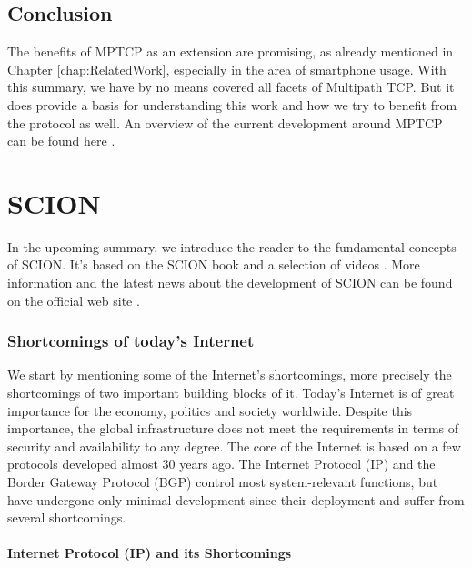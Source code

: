 \subsection*{Conclusion}

The benefits of MPTCP as an extension are promising, as already mentioned in Chapter \ref{chap:RelatedWork}, especially in the area of smartphone usage.  With this summary, we have by no means covered all facets of Multipath TCP. But it does provide a basis for understanding this work and how we try to benefit from the protocol as well. An overview of the current development around MPTCP can be found here \cite{MPTCPWebMain}.

\section{SCION}
\label{sec:SCION}

In the upcoming summary, we introduce the reader to the fundamental concepts of SCION. It's based on the SCION book \cite{SCIONBook} and a selection of videos \cite{SCIONWebVideos}. More information and the latest news about the development of SCION can be found on the official web site \cite{SCIONWebMain}.

\subsubsection{Shortcomings of today's Internet}

We start by mentioning some of the Internet's shortcomings, more precisely the shortcomings of two important building blocks of it. Today's Internet is of great importance for the economy, politics and society worldwide. Despite this importance, the global infrastructure does not meet the requirements in terms of security and availability to any degree. The core of the Internet is based on a few protocols developed almost 30 years ago. The Internet Protocol (IP) and the Border Gateway Protocol (BGP) control most system-relevant functions, but have undergone only minimal development since their deployment and suffer from several shortcomings.

\paragraph{Internet Protocol (IP) and its Shortcomings}

